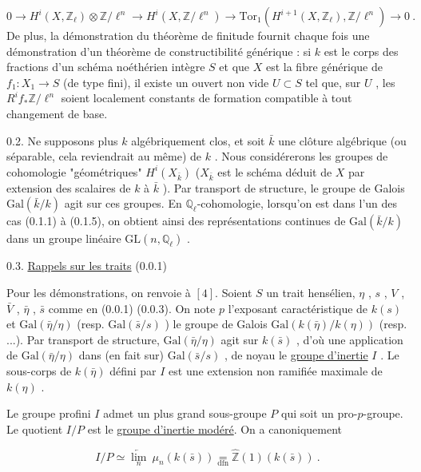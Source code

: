 \begin{equation*}
0 \longrightarrow H^i(X,\mathbb{Z}_\ell) \otimes \mathbb{Z}/\ell^n \longrightarrow H^i(X,\mathbb{Z}/\ell^n) \longrightarrow \mathrm{Tor}_1(H^{i+1}(X,\mathbb{Z}_\ell),\mathbb{Z}/\ell^n) \longrightarrow 0 \ .
\end{equation*}
De plus, la démonstration du théorème de finitude fournit chaque fois une démonstration d'un théorème de constructibilité générique : si  $k$  est le corps des fractions d'un schéma noéthérien intègre  $S$  et que  $X$  est la fibre générique de  $f_1 : X_1 \longrightarrow S$  (de type fini), il existe un ouvert non vide  $U \subset S$  tel que, sur  $U$ , les $R^i f_* \mathbb{Z}/\ell^n$  soient localement constants de formation compatible à tout changement de base.

0.2. Ne supposons plus  $k$  algébriquement clos, et soit  $\bar{k}$  une clôture algébrique (ou séparable, cela reviendrait au même) de  $k$ . Nous considérerons les groupes de cohomologie "géométriques"  $H^i(X_{\bar{k}})$  ($X_{\bar{k}}$  est le schéma déduit de  $X$  par extension des scalaires de  $k$  à  $\bar{k}$ ). Par transport de structure, le groupe de Galois  $\mathrm{Gal}(\bar{k}/k)$  agit sur ces groupes. En  $\mathbb{Q}_\ell$-cohomologie, lorsqu'on est dans l'un des cas (0.1.1) à (0.1.5), on obtient ainsi des représentations continues de  $\mathrm{Gal}(\bar{k}/k)$  dans un groupe linéaire  $\mathrm{GL}(n,\mathbb{Q}_\ell)$ .


0.3. \underline{Rappels sur les traits} (0.0.1)

Pour les démonstrations, on renvoie à $[4]$. Soient  $S$  un trait hensélien, $\eta$ , $s$ , $V$ , $\bar{V}$ , $\bar{\eta}$ , $\bar{s}$  comme en (0.0.1) (0.0.3). On note  $p$  l'exposant caractéristique de  $k(s)$  et  $\mathrm{Gal}(\bar{\eta}/\eta)$  (resp.  $\mathrm{Gal}(\bar{s}/s)$ ) le groupe de Galois  $\mathrm{Gal}(k(\bar{\eta})/k(\eta))$  (resp. ...). Par transport de structure,  $\mathrm{Gal}(\bar{\eta}/\eta)$  agit sur  $k(\bar{s})$ , d'où une application de $\mathrm{Gal}(\bar{\eta}/\eta)$  dans (en fait sur)  $\mathrm{Gal}(\bar{s}/s)$ , de noyau le \underline{groupe d'inertie}  $I$ . Le sous-corps de  $k(\bar{\eta})$  défini par  $I$  est une extension non ramifiée maximale de  $k(\eta)$ .

Le groupe profini  $I$  admet un plus grand sous-groupe  $P$  qui soit un pro-$p$-groupe. Le quotient  $I/P$  est le \underline{groupe d'inertie modéré}. On a canoniquement

\begin{equation*}
I/P \simeq \underset{n}{\underleftarrow{\lim}}\ \mu_n(k(\bar{s})) \underset{\mathrm{dfn}}{=} \widehat{\mathbb{Z}}(1)(k(\bar{s})) \ .
\end{equation*}

